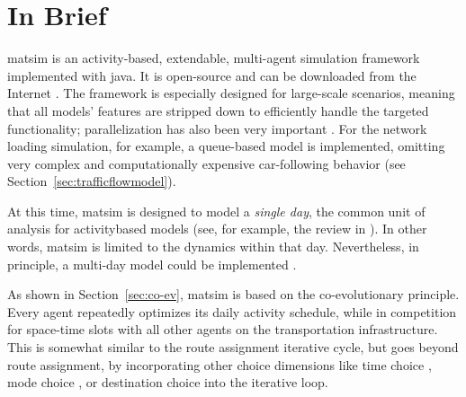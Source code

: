 \section{In Brief}
\label{sec:inbrief}
\gls{matsim} is an activity-based, extendable, multi-agent simulation \gls{framework} 
implemented with 
\gls{java}. It is open-source and can be downloaded from the Internet \citep[][]{MATSIM_Webpage_2015, SourceForge_Webpage_2015}. The \gls{framework} is especially designed for large-scale scenarios, meaning that all models' features are stripped down to efficiently handle the targeted functionality; parallelization has also been very important \citep[e.g.,][]{Dobler_TechRep_IVT_2011, Charypar_PhDThesis_2008}. For the network loading simulation, for example, a queue-based model is implemented, omitting very complex and computationally expensive car-following behavior (see Section~\ref{sec:trafficflowmodel}).

At this time, \gls{matsim} is 
%
designed to model a \emph{single day}, the common unit of analysis for \gls{activitybased} models (see, for example, the review in \citet[][]{Bowman_TEC_2009_1}). In other words, \gls{matsim} is limited to the dynamics within that day. Nevertheless, in principle, a multi-day model could be implemented \citep[][]{HorniEtAl_TechRep_IVT_2012_a}.

As shown in Section~\ref{sec:co-ev}, \gls{matsim} is based on the co-evolutionary principle. Every agent repeatedly optimizes its daily \gls{activity} schedule, while in  competition for space-time slots with all other agents on the transportation infrastructure.  This is somewhat similar to the route assignment iterative cycle, but goes beyond route assignment, by incorporating other choice dimensions like time choice \citep{BalmerRaneyEtAl2005act-times}, mode choice \citep{GretherEtAl2009SimpleModeChoiceIPL}, or destination choice \citep{HorniEtAl_unpub_TRB_2012} into the iterative loop.

